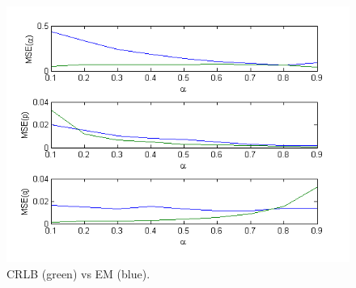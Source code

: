 \begin{figure}[!htbp]
	\centering
	\includegraphics[width=\columnwidth]{images/EM_plot.png} %
	\vspace{-1pt}
	\caption{CRLB (green) vs EM (blue).}
	\vspace{-2pt}
	\label{figure:crlb-em}
\end{figure}

